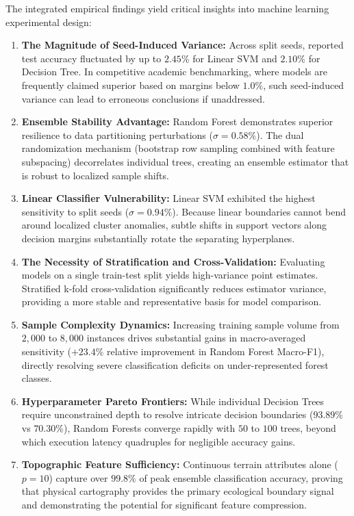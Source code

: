 The integrated empirical findings yield critical insights into machine learning experimental design:
\begin{enumerate}
    \item \textbf{The Magnitude of Seed-Induced Variance:} Across split seeds, reported test accuracy fluctuated by up to $2.45\%$ for Linear SVM and $2.10\%$ for Decision Tree. In competitive academic benchmarking, where models are frequently claimed superior based on margins below $1.0\%$, such seed-induced variance can lead to erroneous conclusions if unaddressed.
    \item \textbf{Ensemble Stability Advantage:} Random Forest demonstrates superior resilience to data partitioning perturbations ($\sigma = 0.58\%$). The dual randomization mechanism (bootstrap row sampling combined with feature subspacing) decorrelates individual trees, creating an ensemble estimator that is robust to localized sample shifts.
    \item \textbf{Linear Classifier Vulnerability:} Linear SVM exhibited the highest sensitivity to split seeds ($\sigma = 0.94\%$). Because linear boundaries cannot bend around localized cluster anomalies, subtle shifts in support vectors along decision margins substantially rotate the separating hyperplanes.
    \item \textbf{The Necessity of Stratification and Cross-Validation:} Evaluating models on a single train-test split yields high-variance point estimates. Stratified k-fold cross-validation significantly reduces estimator variance, providing a more stable and representative basis for model comparison.
    \item \textbf{Sample Complexity Dynamics:} Increasing training sample volume from $2,000$ to $8,000$ instances drives substantial gains in macro-averaged sensitivity ($+23.4\%$ relative improvement in Random Forest Macro-F1), directly resolving severe classification deficits on under-represented forest classes.
    \item \textbf{Hyperparameter Pareto Frontiers:} While individual Decision Trees require unconstrained depth to resolve intricate decision boundaries ($93.89\%$ vs $70.30\%$), Random Forests converge rapidly with $50$ to $100$ trees, beyond which execution latency quadruples for negligible accuracy gains.
    \item \textbf{Topographic Feature Sufficiency:} Continuous terrain attributes alone ($p=10$) capture over $99.8\%$ of peak ensemble classification accuracy, proving that physical cartography provides the primary ecological boundary signal and demonstrating the potential for significant feature compression.
\end{enumerate}

